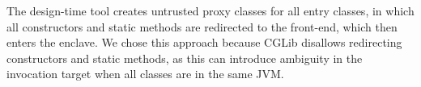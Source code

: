 The \sysname{} design-time tool creates untrusted proxy classes for all entry classes,
in which all constructors and static methods are redirected to
the \sysname{} front-end, which then enters the enclave.
We chose this approach because CGLib disallows redirecting 
constructors and static methods, as this can introduce ambiguity in
the invocation target when all classes are in the same JVM.




